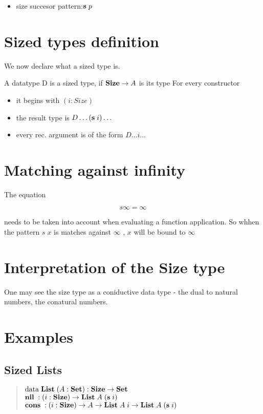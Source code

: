 \begin{itemize}
\item
size succesor pattern:$ \mathbf{s}\; p $ 
\end{itemize}

\section{Sized types definition}
We now declare what a sized type is.
\begin{definition}
A datatype D is a sized type, if $ \mathbf{Size} \rightarrow A $ is its type
For every constructor 
\begin{itemize}
\item
it begins with $(i: Size)$
\item
the result type is $D \dots (\mathbf{s}\; i) \dots $
\item
every rec. argument is of the form $ D \dots i \dots $
\end{itemize}
\end{definition}

\section{Matching against infinity}
The equation 

\[ s \infty = \infty \]

needs to be taken into account when evaluating a function application.
So whhen the pattern $ s \; x $ is matches against $ \infty $ , $x$ will be bound to $ \infty $  

\section{Interpretation of the Size type}
One may see the size type as a coniductive data type - the dual to natural numbers, the conatural numbers.


\section{Examples}
\subsection{Sized Lists}
\begin{quote}
$\mathrm{data}\; \mathbf{List}\; ( A : \mathbf{Set} ) : \mathbf{Size} \rightarrow \mathbf{Set} $ 
\\
$\mathbf{nil}\; : ( i : \mathbf{Size} ) \rightarrow  \mathbf{List}\; A \; (\mathbf{s}\; i) $
\\
$\mathbf{cons}\; : ( i : \mathbf{Size} ) \rightarrow  A \rightarrow \mathbf{List}\; A \; i \rightarrow \mathbf{List}\; A \; (\mathbf{s}\; i) $
\end{quote}

